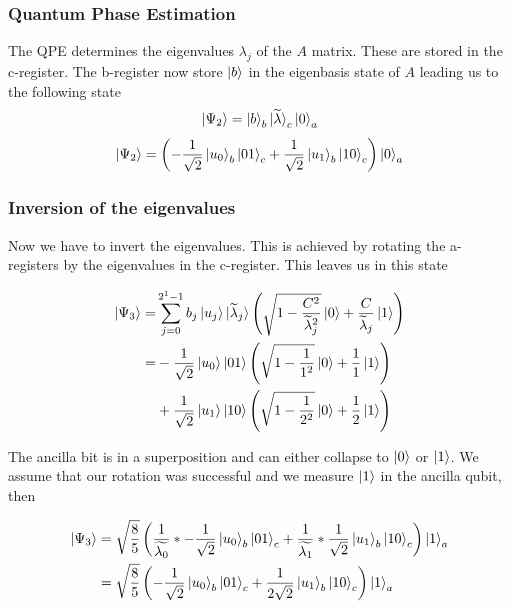\subsubsection{Quantum Phase Estimation}
    The QPE determines the eigenvalues $\lambda_j$ of the $A$ matrix. 
    These are stored in the c-register. 
    The b-register now store $\ket b$ in the eigenbasis state of $A$ leading us to the following state
    \begin{equation}
    \ket{\Psi_2} = \ket{b}_b \ket{\widetilde{\lambda}}_c\ket{0}_a
    \end{equation}
    \begin{equation}
    \ket{\Psi_2} =\left(-\frac{1}{\sqrt{2}} \ket{u_0}_b \ket{01}_c +\frac{1}{\sqrt{2}} \ket{u_1}_b \ket{10}_c \right)  \ket{0}_a
    \end{equation}


\subsubsection{Inversion of the eigenvalues}
    Now we have to invert the eigenvalues. 
    This is achieved by rotating the a-registers by the eigenvalues in the c-register.
    This leaves us in this state

    \begin{equation}
     \begin{split}
    \ket{\Psi_3} =& \sum_{j=0}^{2^{1}-1} b_j \ket{u_j} \ket{\widetilde{\lambda}_j} \left(\sqrt{1-\frac{C^2}{\widetilde{\lambda}_j^2}}\ket{0} + \frac{C}{\widetilde{\lambda}_j} \ket{1}\right) \\
    =&-\frac{1}{\sqrt{2}} \ket{u_0} \ket{01}\left(\sqrt{1-\frac{1}{1^2}}\ket{0} + \frac{1}{1} \ket{1}\right) \\
    &+\frac{1}{\sqrt{2}}  \ket{u_1} \ket{10} \left(\sqrt{1-\frac{1}{2^2}}\ket{0} + \frac{1}{2} \ket{1}\right)
     \end{split}
    \end{equation}

    The ancilla bit is in a superposition and can either collapse to $\ket 0$ or $\ket 1$.
    We assume that our rotation was successful and we measure $\ket{1}$ in the ancilla qubit, then

    \begin{equation}
    \begin{split}
    \ket{\Psi_3} &=\sqrt{\frac{8}{5}}\left(\frac {1} {\widetilde{\lambda_0}} *-\frac{1}{\sqrt{2}} \ket{u_0}_b\ket{01}_c +\frac{1}{\widetilde{\lambda_1}}*\frac{1}{\sqrt{2}} \ket{u_1}_b\ket{10}_c\right)\ket{1}_a \\
    &=\sqrt{\frac{8}{5}}\left(-\frac{1}{\sqrt{2}} \ket{u_0}_b\ket{01}_c +\frac{1}{2\sqrt{2}} \ket{u_1}_b\ket{10}_c\right)\ket{1}_a 
    \end{split}
    \end{equation}

